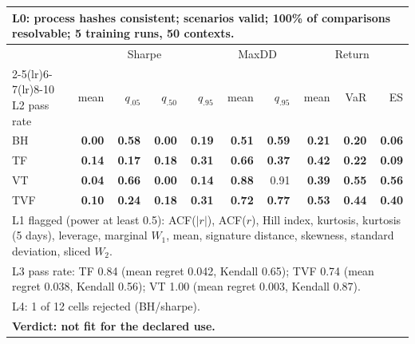 \begin{tabular}{lrrrrrrrrr}
\toprule
\multicolumn{10}{p{13.5cm}}{L0: process hashes consistent; scenarios valid; 100\% of comparisons resolvable; 5 training runs, 50 contexts.} \\
\midrule
 & \multicolumn{4}{c}{Sharpe} & \multicolumn{2}{c}{MaxDD} & \multicolumn{3}{c}{Return} \\
\cmidrule(lr){2-5}\cmidrule(lr){6-7}\cmidrule(lr){8-10}
L2 pass rate & mean & $q_{.05}$ & $q_{.50}$ & $q_{.95}$ & mean & $q_{.95}$ & mean & VaR & ES \\
\midrule
BH & \textbf{0.00} & \textbf{0.58} & \textbf{0.00} & \textbf{0.19} & \textbf{0.51} & \textbf{0.59} & \textbf{0.21} & \textbf{0.20} & \textbf{0.06} \\
TF & \textbf{0.14} & \textbf{0.17} & \textbf{0.18} & \textbf{0.31} & \textbf{0.66} & \textbf{0.37} & \textbf{0.42} & \textbf{0.22} & \textbf{0.09} \\
VT & \textbf{0.04} & \textbf{0.66} & \textbf{0.00} & \textbf{0.14} & \textbf{0.88} & 0.91 & \textbf{0.39} & \textbf{0.55} & \textbf{0.56} \\
TVF & \textbf{0.10} & \textbf{0.24} & \textbf{0.18} & \textbf{0.31} & \textbf{0.72} & \textbf{0.77} & \textbf{0.53} & \textbf{0.44} & \textbf{0.40} \\
\midrule
\multicolumn{10}{p{13.5cm}}{L1 flagged (power at least 0.5): ACF($|r|$), ACF($r$), Hill index, kurtosis, kurtosis (5 days), leverage, marginal $W_1$, mean, signature distance, skewness, standard deviation, sliced $W_2$.} \\
\multicolumn{10}{p{13.5cm}}{L3 pass rate: TF 0.84 (mean regret 0.042, Kendall 0.65); TVF 0.74 (mean regret 0.038, Kendall 0.56); VT 1.00 (mean regret 0.003, Kendall 0.87).} \\
\multicolumn{10}{p{13.5cm}}{L4: 1 of 12 cells rejected (BH/sharpe).} \\
\multicolumn{10}{p{13.5cm}}{\textbf{Verdict: not fit for the declared use.}} \\
\bottomrule
\end{tabular}
